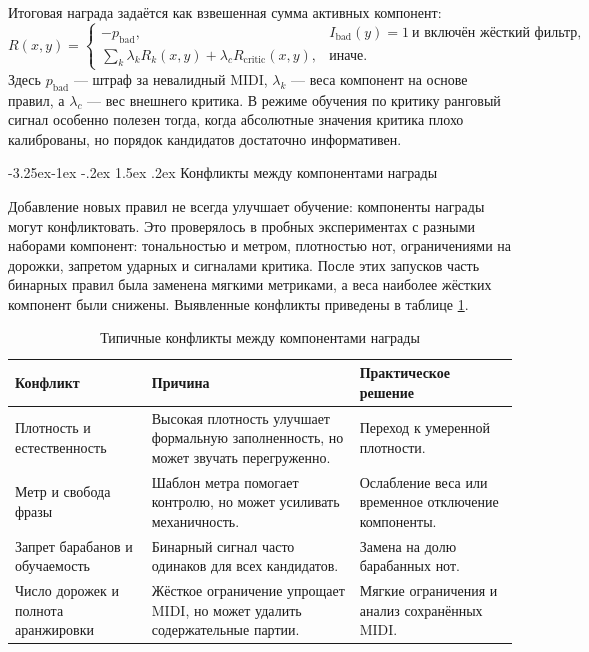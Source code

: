 \documentclass[a4paper,12pt]{extarticle}
\makeatletter
\renewcommand\subsection{\@startsection{subsection}{2}{\z@}%
  {-3.25ex\@plus -1ex \@minus -.2ex}%
  {1.5ex \@plus .2ex}%
  {\normalfont\large\bfseries\Needspace{6\baselineskip}}}
\makeatother
\begin{document}
Итоговая награда задаётся как взвешенная сумма активных компонент:
\[
R(x,y)=
\begin{cases}
-p_{\mathrm{bad}}, & I_{\mathrm{bad}}(y)=1 \ \text{и включён жёсткий фильтр},\\
\sum_k \lambda_k R_k(x,y)+\lambda_c R_{\mathrm{critic}}(x,y), & \text{иначе}.
\end{cases}
\]
Здесь $p_{\mathrm{bad}}$ --- штраф за невалидный MIDI, $\lambda_k$ ---
веса компонент на основе правил, а $\lambda_c$ --- вес внешнего критика. В
режиме обучения по критику ранговый сигнал особенно полезен тогда, когда
абсолютные значения критика плохо калиброваны, но порядок кандидатов
достаточно информативен.

\subsection{Конфликты между компонентами награды}

Добавление новых правил не всегда улучшает обучение: компоненты награды могут
конфликтовать. Это проверялось в пробных экспериментах с разными наборами
компонент: тональностью и метром, плотностью нот, ограничениями на дорожки,
запретом ударных и сигналами критика. После этих запусков часть бинарных
правил была заменена мягкими метриками, а веса наиболее жёстких компонент
были снижены. Выявленные конфликты приведены в таблице
\ref{tab:reward_conflicts}.

\begin{table}[ht]
\centering
\caption{Типичные конфликты между компонентами награды}
\label{tab:reward_conflicts}
\begin{tabular}{|p{}|p{}|p{}|}
\hline
\textbf{Конфликт} & \textbf{Причина} & \textbf{Практическое решение} \\
\hline
Плотность и естественность & Высокая плотность улучшает формальную заполненность, но может звучать перегруженно. & Переход к умеренной плотности. \\
\hline
Метр и свобода фразы & Шаблон метра помогает контролю, но может усиливать механичность. & Ослабление веса или временное отключение компоненты. \\
\hline
Запрет барабанов и обучаемость & Бинарный сигнал часто одинаков для всех кандидатов. & Замена на долю барабанных нот. \\
\hline
Число дорожек и полнота аранжировки & Жёсткое ограничение упрощает MIDI, но может удалить содержательные партии. & Мягкие ограничения и анализ сохранённых MIDI. \\
\hline
\end{tabular}
\end{table}
\end{document}
